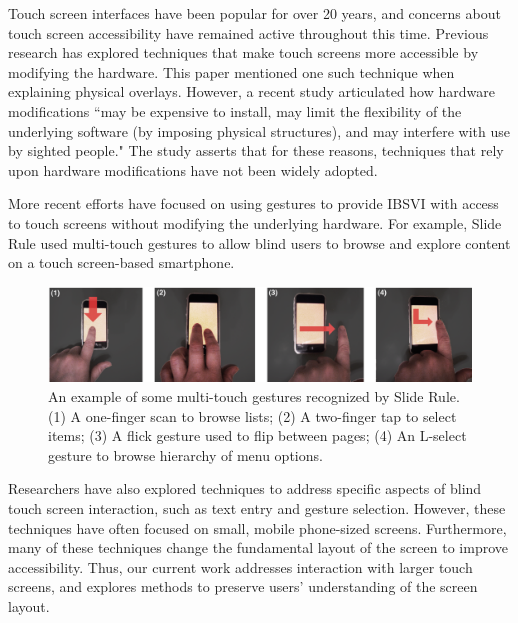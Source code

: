 \documentclass{article}
\begin{document}
Touch screen interfaces have been popular for over 20 years, and concerns about touch screen accessibility have remained active throughout this time. \cite{Buxton:1986:HID:22339.22386} Previous research has explored techniques that make touch screens more accessible by modifying the hardware. This paper mentioned one such technique when explaining physical overlays.\cite{El-Glaly:2013:TTF:2460625.2460665} However, a recent study articulated how hardware modifications ``may be expensive to install, may limit the flexibility of the underlying software (by imposing physical structures), and may interfere with use by sighted people." \cite{Kane:2011:AOI:2047196.2047232}  The study asserts that for these reasons, techniques that rely upon hardware modifications have not been widely adopted.

\clearpage
More recent efforts have focused on using gestures to provide IBSVI with access to touch screens without modifying the underlying hardware. For example, Slide Rule \cite{Kane:2008:SRM:1414471.1414487} used multi-touch gestures to allow blind users to browse and explore content on a touch screen-based smartphone. 

\begin{figure}[ht]
\centering
\includegraphics[width=4.5in]{slide-rule.jpg} 
\caption{An example of some multi-touch gestures recognized by Slide Rule.(1) A one-finger scan to browse lists; (2) A two-finger tap to select items; (3) A flick gesture used to flip between pages; (4) An L-select gesture to browse hierarchy of menu options. \cite{Kane:2008:SRM:1414471.1414487} }
\label{figure-sample}
\end{figure}

  Researchers have also explored techniques to 
address specific aspects of blind touch screen interaction, 
such as text entry and gesture selection\cite{conf/chi/KaneWL11}. 
However, these techniques have often focused on small, 
mobile phone-sized screens. Furthermore, many of these 
techniques change the fundamental layout of the screen to 
improve accessibility. Thus, our current work addresses 
interaction with larger touch screens, and explores methods 
to preserve users’ understanding of the screen layout. 
\end{document}
